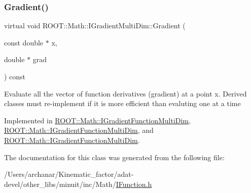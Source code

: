 \mbox{\label{classROOT_1_1Math_1_1IGradientMultiDim_ac5785e2df4fa36061bf9ddbb9ce4dde0}} 
\subsubsection{\texorpdfstring{Gradient()}{Gradient()}\hspace{0.1cm}{\footnotesize\ttfamily [3/3]}}
{\footnotesize\ttfamily virtual void R\+O\+O\+T\+::\+Math\+::\+I\+Gradient\+Multi\+Dim\+::\+Gradient (\begin{DoxyParamCaption}\item[{const double $\ast$}]{x,  }\item[{double $\ast$}]{grad }\end{DoxyParamCaption}) const\hspace{0.3cm}{\ttfamily [pure virtual]}}

Evaluate all the vector of function derivatives (gradient) at a point x. Derived classes must re-\/implement if it is more efficient than evaluting one at a time 

Implemented in \mbox{\hyperlink{classROOT_1_1Math_1_1IGradientFunctionMultiDim_ab65a713d2637c69b334d2119ef4f0e26}{R\+O\+O\+T\+::\+Math\+::\+I\+Gradient\+Function\+Multi\+Dim}}, \mbox{\hyperlink{classROOT_1_1Math_1_1IGradientFunctionMultiDim_ab65a713d2637c69b334d2119ef4f0e26}{R\+O\+O\+T\+::\+Math\+::\+I\+Gradient\+Function\+Multi\+Dim}}, and \mbox{\hyperlink{classROOT_1_1Math_1_1IGradientFunctionMultiDim_ab65a713d2637c69b334d2119ef4f0e26}{R\+O\+O\+T\+::\+Math\+::\+I\+Gradient\+Function\+Multi\+Dim}}.



The documentation for this class was generated from the following file\+:\begin{DoxyCompactItemize}
\item 
/\+Users/archanar/\+Kinematic\+\_\+factor/adat-\/devel/other\+\_\+libs/minuit/inc/\+Math/\mbox{\hyperlink{adat-devel_2other__libs_2minuit_2inc_2Math_2IFunction_8h}{I\+Function.\+h}}\end{DoxyCompactItemize}

